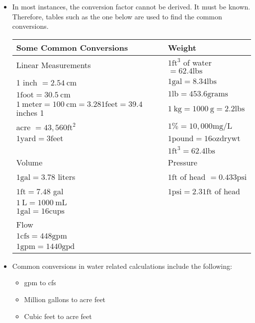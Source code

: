 \begin{itemize}
\item In most instances, the conversion factor cannot be derived. It must be known. Therefore, tables such as the one below are used to find the common conversions.\\
\begin{tabular}{|l|l|}
\hline
Some Common Conversions & Weight \\
\hline
Linear Measurements & $1 \mathrm{ft}^{3}$ of water $=62.4 \mathrm{lbs}$ \\
\hline
1 inch $=2.54 \mathrm{~cm}$ & $1 \mathrm{gal}=8.34 \mathrm{lbs}$ \\
$1 \mathrm{foot}=30.5 \mathrm{~cm}$ & $1 \mathrm{lb}=453.6 \mathrm{grams}$ \\
$1 \mathrm{~meter}=100 \mathrm{~cm}=3.281 \mathrm{feet}=39.4$ inches 1 & $1 \mathrm{~kg}=1000 \mathrm{~g}=2.2 \mathrm{lbs}$ \\
acre $=43,560 \mathrm{ft}^{2}$ & $1 \%=10,000 \mathrm{mg} / \mathrm{L}$ \\
$1 \mathrm{yard}=3 \mathrm{feet}$ & $1 \mathrm{pound}=16 \mathrm{oz} \mathrm{dry} \mathrm{wt}$ \\
 & $1 \mathrm{ft}^{3}=62.4 \mathrm{lbs}$ \\
\hline
Volume & Pressure \\
\hline
$1 \mathrm{gal}=3.78$ liters & $1 \mathrm{ft}$ of head $=0.433 \mathrm{psi}$ \\
$1 \mathrm{ft}=7.48$ gal & $1 \mathrm{psi}=2.31 \mathrm{ft}$ of head \\
$1 \mathrm{~L}=1000 \mathrm{~mL}$ &  \\
$1 \mathrm{gal}=16 \mathrm{cups}$ &  \\
\hline
Flow &  \\
\hline
$1 \mathrm{cfs}=448 \mathrm{gpm}$ &  \\
$1 \mathrm{gpm}=1440 \mathrm{gpd}$ &  \\
\hline
\end{tabular}
\vspace{0.2cm}
\item Common conversions in water related calculations include the following:

\begin{itemize}
  \item gpm to cfs

  \item Million gallons to acre feet

  \item Cubic feet to acre feet


\end{itemize}
\end{itemize}
